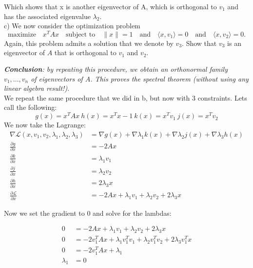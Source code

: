 \documentclass[12pt,twoside]{article}
\newcommand{\sT}{T}
\newcommand{\Lagr}{\mathcal{L}}
\begin{document}
Which shows that x is another eigenvector of A, which is orthogonal to $v_1$ and has the associated eigenvalue $\lambda_2$.\\


c) We now consider the optimization problem
	\begin{equation}\label{eq:eig3}
		\text{maximize} \quad x^{\sT} A x \quad \text{subject to} \quad \|x\| = 1
		\quad \text{and} \quad \langle x,v_1 \rangle = 0
		\quad \text{and} \quad \langle x,v_2 \rangle = 0.
	\end{equation}
	Again, this problem admits a solution that we denote by $v_3$. Show that $v_3$ is an eigenvector of $A$ that is orthogonal to $v_1$ and $v_2$.

	\emph{
		\textbf{Conclusion}: by repeating this procedure, we obtain an orthonormal family $v_1, \dots, v_n$ of eigenvectors of $A$. This proves the spectral theorem (without using any linear algebra result!).
	}
	\\
	
We repeat the same procedure that we did in b, but now with 3 constraints. Lets call the following:
$$
    g(x) = x^TAx \ h(x) = x^Tx-1 \ k(x) = x^Tv_1 \ j(x) = x^Tv_2 
$$
We now take the Lagrange:
\begin{equation}
    \begin{split}
    \nabla \Lagr(x, v_1,v_2,\lambda_1, \lambda_2, \lambda_3) &= \nabla g(x) + \nabla \lambda_1 k(x)  + \nabla \lambda_2 j(x) + \nabla \lambda_3 h(x) \\
    \frac{\partial g}{\partial x} &= -2Ax \\
        \frac{\partial k}{\partial x} &= \lambda_1 v_1 \\
        \frac{\partial j}{\partial x} &= \lambda_2 v_2 \\
    \frac{\partial h}{\partial x} &= 2\lambda_3 x \\
    \frac{\partial \Lagr}{\partial x} &= -2Ax + \lambda_1 v_1 + \lambda_2 v_2 + 2\lambda_3x 
    \end{split}
\end{equation}

Now we set the gradient to 0 and solve for the lambdas:

\begin{equation}
    \begin{split}
        0 &= -2Ax + \lambda_1 v_1 + \lambda_2 v_2 + 2\lambda_3x  \\
        0 &= -2v_1^TAx + \lambda_1 v_1^Tv_1 + \lambda_2 v_1^Tv_2 + 2\lambda_3 v_1^Tx \\
        0 &= -2v_1^TAx + \lambda_1 \\
        \lambda_1 &= 0
    \end{split}
\end{equation}
\end{document}
